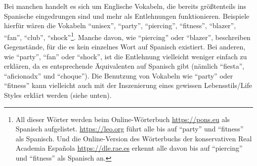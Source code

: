 Bei manchen handelt es sich um Englische Vokabeln, die bereits größtenteils ins Spanische eingedrungen sind und mehr als Entlehnungen funktionieren.
Beispiele hierfür wären die Vokabeln ``unisex'', ``party'', ``piercing'', ``fitness'', ``blazer'', ``fan'', ``club'', ``shock''\footnote{All dieser Wörter werden beim Online-Wörterbuch \url{https://pons.eu} als Spanisch aufgelistet. \url{https://leo.org} führt alle bis auf ``party'' und ``fitness'' als Spanisch. Und die Online-Version des Wörterbuchs der konservativen Real Academia Española \url{https://dle.rae.es} erkennt alle davon bis auf ``piercing'' und ``fitness'' als Spanisch an.}.
Manche davon, wie ``piercing'' oder ``blazer'', beschreiben Gegenstände, für die es kein einzelnes Wort auf Spanisch existiert.
Bei anderen, wie ``party'', ``fan'' oder ``shock'',  ist die Entlehnung vielleicht weniger einfach zu erklären, da es entsprechende Äquivalenten auf Spanisch gibt (nämlich ``fiesta'', ``aficionadx'' und ``choque''). %
Die Benutzung von Vokabeln wie ``party'' oder ``fitness'' kann vielleicht auch mit der Inszenierung eines gewissen Lebensstils/Life Styles erklärt werden (siehe unten).

